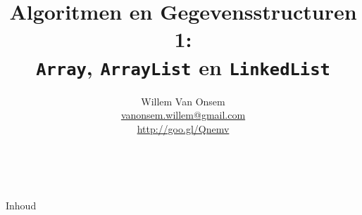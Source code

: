 \documentclass[handout,notheorems]{beamer}
\title{Algoritmen en Gegevensstructuren 1:\\ \texttt{Array}, \texttt{ArrayList} en \texttt{LinkedList}}
\author{Willem Van Onsem\\ \href{mailto:vanonsem.willem@gmail.com?Subject=Presentatie\%20Algoritmen\%20en\%20Gegevensstructuren\%201}{vanonsem.willem@gmail.com} \\ \url{http://goo.gl/Qnemv}}
\theoremstyle{remark}
\theoremstyle{example}
\begin{document}
\begin{frame}
\maketitle
\vfill
\begin{center}\\[2.5ex]{\tiny\CcNote{\CcLongnameByNcSa}}\vspace*{-2.5ex}
\end{center}
\end{frame}
\begin{frame}[plain]{Inhoud}
\tableofcontents
\end{frame}




\end{document}
